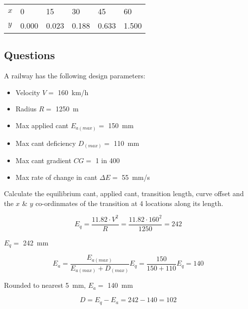 \documentclass{bcrre_exam}
\begin{document}
\begin{table}[h]
\centering
\begin{tabular}{@{}llllll@{}}
\toprule
$x$ & \num{0}     & \num{15}    & \num{30}    & \num{45}    & \num{60}    \\ 
$y$ & \num{0.000} & \num{0.023} & \num{0.188} & \num{0.633} & \num{1.500} \\ \bottomrule
\end{tabular}
\end{table}

\subsection*{Questions}


\begin{questions}
\question 
A railway has the following design parameters:

\begin{itemize}
    \item Velocity $V=$ \qty{160}{km/h}
    \item Radius $R=$ \qty{1250}{m}
    \item Max applied cant $E_{a(max)}=$ \qty{150}{mm}
    \item Max cant deficiency $D_{(max)}=$ \qty{110}{mm}
    \item Max cant gradient $CG=$ \num{1} in \num{400}
    \item Max rate of change in cant $\Delta E=$ \qty{55}{mm/s}
\end{itemize}

Calculate the equilibrium cant, applied cant, transition length, curve offset and the $x$ \& $y$ co-ordinmates of the transition at 4 locations along its length.

\begin{solution}
\begin{equation}
    E_q=\frac{11.82 \cdot V^2}{R}=\frac{11.82 \cdot 160^2}{1250} = 242
\end{equation}

$E_q=$ \qty{242}{mm}

\begin{equation}
    E_a=\frac{E_{a(max)}}{E_{a(max)}+D_{(max)}}E_q = \frac{150}{150+110}E_q = 140
\end{equation}

Rounded to nearest \qty{5}{mm}, $E_a=$ \qty{140}{mm}

\begin{equation}
    D=E_q-E_a=242-140=102
\end{equation}


\end{solution}
\end{questions}
\end{document}
